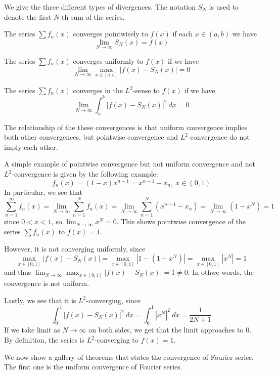 We give the three different types of divergences. The notation $S_N$ is used to denote the first $N$-th sum of the series. 

\medskip 

\begin{defn}
    The series $\sum f_n(x)$ converges pointwisely to $f(x)$ if each $x\in (a,b)$ we have 
    \[\lim_{N\to \infty} S_N(x) = f(x)\]
\end{defn}

\begin{defn}
    The series $\sum f_n(x)$ converges uniformly to $f(x)$ if we have 
    \[\lim_{N\to \infty} \max_{x\in [a,b]}|f(x)- S_N(x)| = 0\]
\end{defn}

\begin{defn}[$L^2$-Convergence]
    The series $\sum f_n(x)$ converges in the $L^2$-sense to $f(x)$ if we have 
    \[\lim_{N\to \infty} \int_a^b |f(x)- S_N(x)|^2\ dx = 0\]
\end{defn}

The relationship of the these convergences is that uniform convergence implies both other convergences, but pointwise convergence and $L^2$-convergence do not imply each other. 

A simple example of pointwise convergence but not uniform convergence and not $L^2$-convergence is given by the following example:
\[f_n(x) = (1-x)x^{n-1} = x^{n-1} - x_n,\ x\in (0,1)\]
In particular, we see that 
\[\sum_{n=1}^{\infty} f_n(x) = \lim_{N\to \infty} \sum_{n=1}^{N} f_n(x) = \lim_{N\to \infty} \sum_{n=1}^{N}(x^{n-1} - x_n) = \lim_{N\to \infty} (1-x^N) = 1\]
since $0<x<1$, so $\lim_{N\to \infty} x^N = 0$. This shows pointwise convergence of the series $\sum f_n(x)$ to $f(x) = 1$. 

However, it is not converging uniformly, since 
\[\max_{x\in [0,1]} |f(x)-S_N(x)| = \max_{x\in [0,1]} |1-(1-x^N)| = \max_{x\in [0,1]} |x^N| = 1\]
and thus $\lim_{N\to \infty} \max_{x\in [0,1]} |f(x)-S_N(x)| = 1 \neq 0$. In othwe words, the convergence is not uniform.

Lastly, we see that it is $L^2$-converging, since 
\[\int_{0}^{1} |f(x)- S_N(x)|^2\ dx = \int_{0}^{1} |x^N|^2\ dx = \frac{1}{2N+1}\]
If we take limit as $N\to \infty$ on both sides, we get that the limit approaches to $0$. By definition, the series is $L^2$-converging to $f(x)=1$.

We now show a gallery of theorems that states the convergence of Fourier series. The first one is the uniform convergence of Fourier series.

